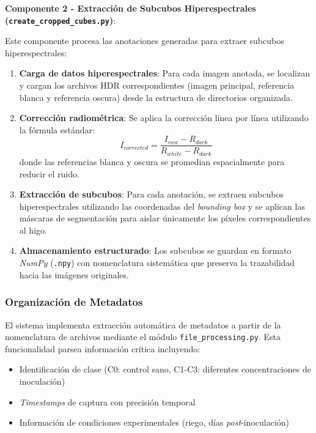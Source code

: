 
\textbf{Componente 2 - Extracción de Subcubos Hiperespectrales (\texttt{create\_cropped\_cubes.py})}:

Este componente procesa las anotaciones generadas para extraer subcubos hiperespectrales:

\begin{enumerate}
\item \textbf{Carga de datos hiperespectrales}: Para cada imagen anotada, se localizan y cargan los archivos HDR correspondientes (imagen principal, referencia blanca y referencia oscura) desde la estructura de directorios organizada.

\item \textbf{Corrección radiométrica}: Se aplica la corrección línea por línea utilizando la fórmula estándar:
\begin{equation}
I_{corrected} = \frac{I_{raw} - R_{dark}}{R_{white} - R_{dark}}
\end{equation}
donde las referencias blanca y oscura se promedian espacialmente para reducir el ruido.

\item \textbf{Extracción de subcubos}: Para cada anotación, se extraen subcubos hiperespectrales utilizando las coordenadas del \emph{bounding box} y se aplican las máscaras de segmentación para aislar únicamente los píxeles correspondientes al higo.

\item \textbf{Almacenamiento estructurado}: Los subcubos se guardan en formato \emph{NumPy} (\texttt{.npy}) con nomenclatura sistemática que preserva la trazabilidad hacia las imágenes originales.
\end{enumerate}

\subsubsection{Organización de Metadatos}

El sistema implementa extracción automática de metadatos a partir de la nomenclatura de archivos mediante el módulo \texttt{file\_processing.py}. Esta funcionalidad parsea información crítica incluyendo:

\begin{itemize}
\item Identificación de clase (C0: control sano, C1-C3: diferentes concentraciones de inoculación)
\item \emph{Timestamps} de captura con precisión temporal
\item Información de condiciones experimentales (riego, días \emph{post}-inoculación)
\end{itemize}

